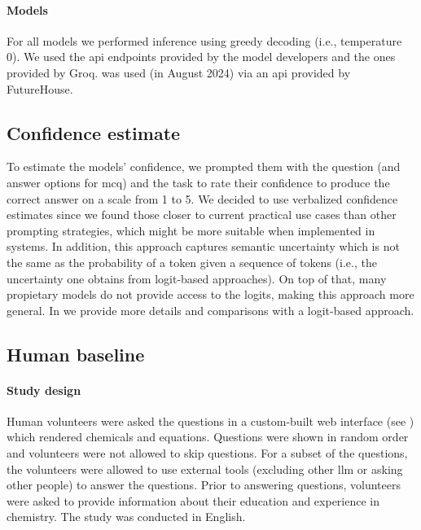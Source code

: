 \documentclass[11pt, oneside]{article}
\begin{document}
\begin{refsection}
\paragraph{Models}
For all models we performed inference using greedy decoding (i.e., temperature 0). We used the \gls{api} endpoints provided by the model developers and the ones provided by Groq. \PaperQATwo was used (in August 2024) via an \gls{api} provided by FutureHouse.

\subsection{Confidence estimate}
To estimate the models' confidence, we prompted them with the question (and answer options for \gls{mcq}) and the task to rate their confidence to produce the correct answer on a scale from 1 to 5.
We decided to use verbalized confidence estimates\autocite{xiong2023llms} since we found those closer to current practical use cases than other prompting strategies, which might be more suitable when implemented in systems. In addition, this approach captures semantic uncertainty which is not the same as the probability of a token given a sequence of tokens (i.e., the uncertainty one obtains from logit-based approaches). On top of that, many propietary models do not provide access to the logits, making this approach more general.
In  we provide more details and comparisons with a logit-based approach.

\subsection{Human baseline}



\paragraph{Study design}
Human volunteers were asked the questions in a custom-built web interface (see ) which rendered chemicals and equations. Questions were shown in random order and volunteers were not allowed to skip questions. For a subset of the questions, the volunteers were allowed to use external tools (excluding other \gls{llm} or asking other people) to answer the questions. Prior to answering questions, volunteers were asked to provide information about their education and experience in chemistry. The study was conducted in English.


\end{refsection}
\end{document}
